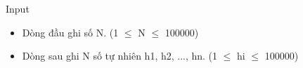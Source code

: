 Input
\begin{itemize}
	\item     Dòng đầu ghi số N. (1  $\le$  N  $\le$  100000)   
\end{itemize}
\begin{itemize}
	\item     Dòng sau ghi N số tự nhiên h1, h2, ..., hn. (1  $\le$  hi  $\le$  100000)   
\end{itemize}